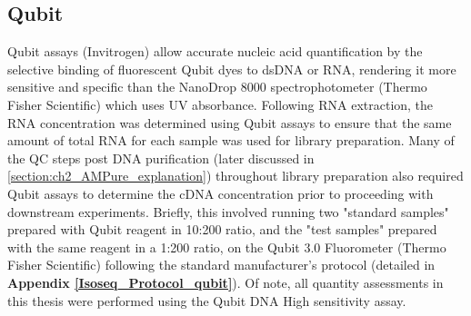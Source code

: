 \subsection{Qubit}
\label{section:ch2_qubit}   
Qubit assays (Invitrogen) allow accurate nucleic acid quantification by the selective binding of fluorescent Qubit dyes to dsDNA or RNA, rendering it more sensitive and specific than the NanoDrop 8000 spectrophotometer (Thermo Fisher Scientific) which uses UV absorbance. Following RNA extraction, the RNA concentration was determined using Qubit assays to ensure that the same amount of total RNA for each sample was used for library preparation. Many of the QC steps post DNA purification (later discussed in \cref{section:ch2_AMPure_explanation}) throughout library preparation also required Qubit assays to determine the cDNA concentration prior to proceeding with downstream experiments. Briefly, this involved running two "standard samples" prepared with Qubit reagent in 10:200 ratio, and the "test samples" prepared with the same reagent in a 1:200 ratio, on the Qubit 3.0 Fluorometer (Thermo Fisher Scientific) following the standard manufacturer's protocol (detailed in \textbf{Appendix  \ref{Isoseq_Protocol_qubit}}). Of note, all quantity assessments in this thesis were performed using the Qubit DNA High sensitivity assay.          

